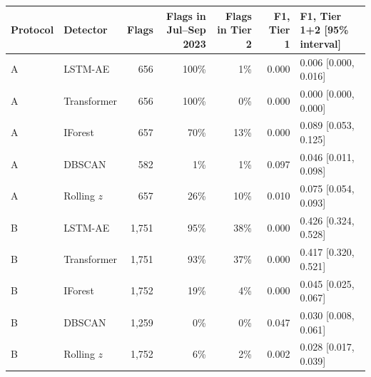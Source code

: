 \begin{tabular}{llrrrrl}
\toprule
Protocol & Detector & Flags & Flags in Jul--Sep 2023 & Flags in Tier 2 & F1, Tier 1 & F1, Tier 1+2 [95\% interval] \\
\midrule
A & LSTM-AE & 656 & 100\% & 1\% & 0.000 & 0.006 [0.000, 0.016] \\
A & Transformer & 656 & 100\% & 0\% & 0.000 & 0.000 [0.000, 0.000] \\
A & IForest & 657 & 70\% & 13\% & 0.000 & 0.089 [0.053, 0.125] \\
A & DBSCAN & 582 & 1\% & 1\% & 0.097 & 0.046 [0.011, 0.098] \\
A & Rolling $z$ & 657 & 26\% & 10\% & 0.010 & 0.075 [0.054, 0.093] \\
B & LSTM-AE & 1,751 & 95\% & 38\% & 0.000 & 0.426 [0.324, 0.528] \\
B & Transformer & 1,751 & 93\% & 37\% & 0.000 & 0.417 [0.320, 0.521] \\
B & IForest & 1,752 & 19\% & 4\% & 0.000 & 0.045 [0.025, 0.067] \\
B & DBSCAN & 1,259 & 0\% & 0\% & 0.047 & 0.030 [0.008, 0.061] \\
B & Rolling $z$ & 1,752 & 6\% & 2\% & 0.002 & 0.028 [0.017, 0.039] \\
\bottomrule
\end{tabular}
